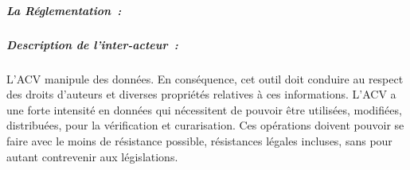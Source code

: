 % 



\subparagraph{La Réglementation~:}
 \subparagraph{Description de l'inter-acteur~:}
 L'\gls{ACV} manipule des données.
 En conséquence, cet outil doit conduire au respect des droits d'auteurs et diverses propriétés relatives à ces informations.
 L'\gls{ACV} a une forte intensité en données qui nécessitent de pouvoir être utilisées, modifiées, distribuées, pour la vérification et curarisation.
 Ces opérations doivent pouvoir se faire avec le moins de résistance possible, résistances légales incluses, sans pour autant contrevenir aux législations.
 
% 
% 
  
